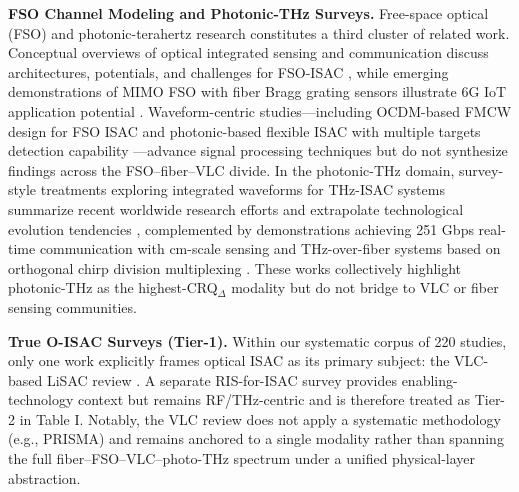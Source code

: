 \textbf{FSO Channel Modeling and Photonic-THz Surveys.} Free-space optical (FSO) and photonic-terahertz research constitutes a third cluster of related work. Conceptual overviews of optical integrated sensing and communication discuss architectures, potentials, and challenges for FSO-ISAC \cite{O_ISAC_021}, while emerging demonstrations of MIMO FSO with fiber Bragg grating sensors illustrate 6G IoT application potential \cite{O_ISAC_199}. Waveform-centric studies---including OCDM-based FMCW design for FSO ISAC \cite{O_ISAC_035} and photonic-based flexible ISAC with multiple targets detection capability \cite{O_ISAC_058}---advance signal processing techniques but do not synthesize findings across the FSO--fiber--VLC divide. In the photonic-THz domain, survey-style treatments exploring integrated waveforms for THz-ISAC systems summarize recent worldwide research efforts and extrapolate technological evolution tendencies \cite{O_ISAC_070}, complemented by demonstrations achieving 251 Gbps real-time communication with cm-scale sensing \cite{O_ISAC_016} and THz-over-fiber systems based on orthogonal chirp division multiplexing \cite{O_ISAC_077}. These works collectively highlight photonic-THz as the highest-CRQ$_{\Delta}$ modality but do not bridge to VLC or fiber sensing communities.

\textbf{True O-ISAC Surveys (Tier-1).} Within our systematic corpus of 220 studies, only one work explicitly frames optical ISAC as its primary subject: the VLC-based LiSAC review \cite{O_ISAC_303}. A separate RIS-for-ISAC survey \cite{O_ISAC_163} provides enabling-technology context but remains RF/THz-centric and is therefore treated as Tier-2 in Table I. Notably, the VLC review does not apply a systematic methodology (e.g., PRISMA) and remains anchored to a single modality rather than spanning the full fiber--FSO--VLC--photo-THz spectrum under a unified physical-layer abstraction.

